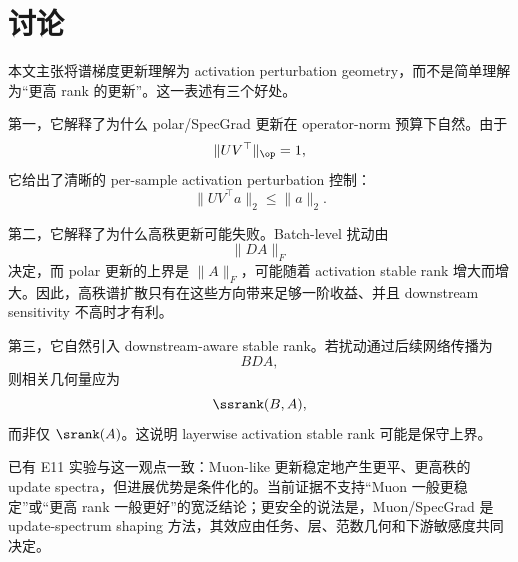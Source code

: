 \section{讨论}

本文主张将谱梯度更新理解为 activation perturbation geometry，而不是简单理解为“更高 rank 的更新”。这一表述有三个好处。

第一，它解释了为什么 polar/SpecGrad 更新在 operator-norm 预算下自然。由于
\[
\|UV^\top\|_{\op}=1,
\]
它给出了清晰的 per-sample activation perturbation 控制：
\[
\|UV^\top a\|_2\le \|a\|_2.
\]

第二，它解释了为什么高秩更新可能失败。Batch-level 扰动由
\[
\|D A\|_F
\]
决定，而 polar 更新的上界是 \(\|A\|_F\)，可能随着 activation stable rank 增大而增大。因此，高秩谱扩散只有在这些方向带来足够一阶收益、并且 downstream sensitivity 不高时才有利。

第三，它自然引入 downstream-aware stable rank。若扰动通过后续网络传播为
\[
BDA,
\]
则相关几何量应为
\[
\ssrank(B,A),
\]
而非仅 \(\srank(A)\)。这说明 layerwise activation stable rank 可能是保守上界。

已有 E11 实验与这一观点一致：Muon-like 更新稳定地产生更平、更高秩的 update spectra，但进展优势是条件化的。当前证据不支持“Muon 一般更稳定”或“更高 rank 一般更好”的宽泛结论；更安全的说法是，Muon/SpecGrad 是 update-spectrum shaping 方法，其效应由任务、层、范数几何和下游敏感度共同决定。
